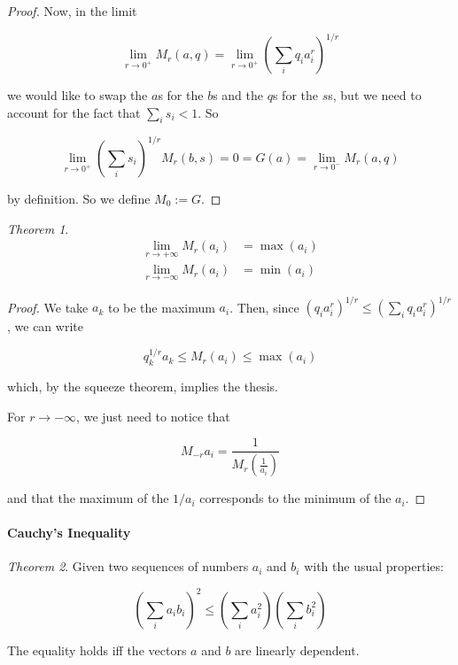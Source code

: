 \documentclass[12pt,a4paper]{report}
\numberwithin{equation}{section}
\theoremstyle{definition}
\theoremstyle{remark}
\newtheorem{theorem}{Theorem}[section]
\begin{document}
\begin{proof}
Now, in the limit

\begin{equation}
\lim _{r\rightarrow 0^+} M_r (a, q) = \lim_{r\rightarrow 0^+} \left( \sum_i q_i a_i ^r \right) ^{1/r}
\end{equation}

we would like to swap the $a$s for the $b$s and the $q$s for the $s$s, but we need to account for the fact that $\sum_i s_i < 1$. 
So

\begin{equation}
\lim_{r\rightarrow 0^+} \left( \sum_i s_i \right) ^{1/r} M_r (b, s) = 0 = G(a) = \lim_{r\rightarrow 0^-} M_r (a, q)
\end{equation}

by definition. So we define $M_0 := G$.
\end{proof}

\begin{theorem}
\begin{align}
\lim_{r\rightarrow +\infty} M_r (a_i) &= \max (a_i)\\
\lim_{r\rightarrow -\infty} M_r (a_i) &= \min (a_i)
\end{align}
\end{theorem}

\begin{proof}
We take $a_k$ to be the maximum $a_i$. Then, since $(q_i a_i^r) ^{1/r} \leq \left( \sum_i q_i a_i^r\right)^{1/r}$, we can write

\begin{equation}
q_k^{1/r} a_k \leq M_r (a_i) \leq \max (a_i)
\end{equation}

which, by the squeeze theorem, implies the thesis.

For $r\rightarrow -\infty$, we just need to notice that

\begin{equation}
M_{-r} a_i = \frac{1}{M_r \left(\frac{1}{a_i}\right)}
\end{equation}

and that the maximum of the $1/a_i$ corresponds to the minimum of the $a_i$.
\end{proof}

\paragraph{Cauchy's Inequality}

\begin{theorem}
Given two sequences of numbers $a_i$ and $b_i$ with the usual properties:

\begin{equation}
\left( 
    \sum_i a_i b_i 
\right)^2
\leq
\left(
    \sum_i a_i ^2
\right)
\left(
    \sum_i b_i ^2
\right)
\end{equation}

The equality holds iff the vectors $a$ and $b$ are linearly dependent.
\end{theorem}
\end{document}
